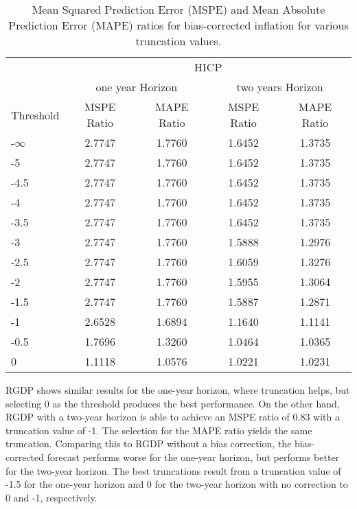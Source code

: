 \documentclass[11pt]{article}
\begin{document}
	\begin{table}[!h]
		\centering
		\caption{Mean Squared Prediction Error (MSPE) and Mean Absolute Prediction Error (MAPE) ratios for bias-corrected inflation for various truncation values.}
		\label{tab: MSPE HICP bias}
		\begin{tabular}{lcccc}
			\hline
			&                        \multicolumn{4}{c}{HICP}                         \\
			\cmidrule(lr){2-5}                              & \multicolumn{2}{c}{one year Horizon} & \multicolumn{2}{c}{two years Horizon} \\
			\cmidrule(lr){2-3} \cmidrule(lr){4-5}
			Threshold & MSPE Ratio & MAPE Ratio  & MSPE Ratio & MAPE Ratio  \\ \hline
			-$\infty$ & 2.7747 & 1.7760 & 1.6452 & 1.3735\\ 
			-5 & 2.7747 & 1.7760 & 1.6452 & 1.3735\\ 
			-4.5 & 2.7747 & 1.7760 & 1.6452 & 1.3735\\ 
			-4 & 2.7747 & 1.7760 & 1.6452 & 1.3735\\ 
			-3.5 & 2.7747 & 1.7760 & 1.6452 & 1.3735\\ 
			-3 & 2.7747 & 1.7760 & 1.5888 & 1.2976\\ 
			-2.5 & 2.7747 & 1.7760 & 1.6059 & 1.3276\\ 
			-2 & 2.7747 & 1.7760 & 1.5955 & 1.3064\\ 
			-1.5 & 2.7747 & 1.7760 & 1.5887 & 1.2871\\ 
			-1 & 2.6528 & 1.6894 & 1.1640 & 1.1141\\ 
			-0.5 & 1.7696 & 1.3260 & 1.0464 & 1.0365\\ 
			0 & 1.1118 & 1.0576 & 1.0221 & 1.0231\\ \hline
		\end{tabular}
	\end{table}
	
	
	RGDP shows similar results for the one-year horizon, where truncation helps, but selecting 0 as the threshold produces the best performance. On the other hand, RGDP with a two-year horizon is able to achieve an MSPE ratio of 0.83 with a truncation value of -1. The selection for the MAPE ratio yields the same truncation. Comparing this to RGDP without a bias correction, the bias-corrected forecast performs worse for the one-year horizon, but performs better for the two-year horizon. The best truncations result from a truncation value of -1.5 for the one-year horizon and 0 for the two-year horizon with no correction to 0 and -1, respectively.
	
\end{document}
